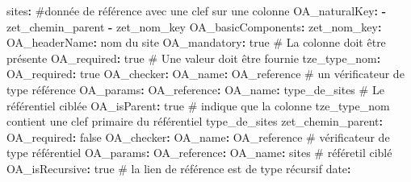 \documentclass[
  letterpaper,
  DIV=11,
  numbers=noendperiod]{scrartcl}
\newenvironment{Shaded}{\begin{snugshade}}{\end{snugshade}}
\newcommand{\AttributeTok}[1]{\textcolor[rgb]{0.40,0.45,0.13}{#1}}
\newcommand{\CharTok}[1]{\textcolor[rgb]{0.13,0.47,0.30}{#1}}
\newcommand{\CommentTok}[1]{\textcolor[rgb]{0.37,0.37,0.37}{#1}}
\newcommand{\FunctionTok}[1]{\textcolor[rgb]{0.28,0.35,0.67}{#1}}
\newcommand{\KeywordTok}[1]{\textcolor[rgb]{0.00,0.23,0.31}{\textbf{#1}}}
\begin{document}
\begin{Shaded}
\begin{Highlighting}[]
\AttributeTok{  }\FunctionTok{sites}\KeywordTok{:}
\CommentTok{  \#donnée de référence avec une clef sur une colonne}
\AttributeTok{    }\FunctionTok{OA\_naturalKey}\KeywordTok{:}\AttributeTok{ }
\AttributeTok{      }\KeywordTok{{-}}\AttributeTok{ zet\_chemin\_parent}
\AttributeTok{      }\KeywordTok{{-}}\AttributeTok{ zet\_nom\_key}
\AttributeTok{    }\FunctionTok{OA\_basicComponents}\KeywordTok{:}
\AttributeTok{      }\FunctionTok{zet\_nom\_key}\KeywordTok{:}
\AttributeTok{        }\FunctionTok{OA\_headerName}\KeywordTok{:}\AttributeTok{ nom du site}
\AttributeTok{        }\FunctionTok{OA\_mandatory}\KeywordTok{:}\AttributeTok{ }\CharTok{true}\CommentTok{ \# La colonne doit être présente}
\AttributeTok{        }\FunctionTok{OA\_required}\KeywordTok{:}\AttributeTok{ }\CharTok{true}\CommentTok{ \# Une valeur doit être fournie}
\AttributeTok{      }\FunctionTok{tze\_type\_nom}\KeywordTok{:}
\AttributeTok{        }\FunctionTok{OA\_required}\KeywordTok{:}\AttributeTok{ }\CharTok{true}
\AttributeTok{        }\FunctionTok{OA\_checker}\KeywordTok{:}
\AttributeTok{          }\FunctionTok{OA\_name}\KeywordTok{:}\AttributeTok{ OA\_reference}\CommentTok{ \# un vérificateur de type référence}
\AttributeTok{          }\FunctionTok{OA\_params}\KeywordTok{:}
\AttributeTok{            }\FunctionTok{OA\_reference}\KeywordTok{:}
\AttributeTok{              }\FunctionTok{OA\_name}\KeywordTok{:}\AttributeTok{ type\_de\_sites}\CommentTok{ \# Le référentiel ciblée}
\AttributeTok{              }\FunctionTok{OA\_isParent}\KeywordTok{:}\AttributeTok{ }\CharTok{true}\CommentTok{ \# indique que la colonne tze\_type\_nom contient une clef primaire du référentiel type\_de\_sites}
\AttributeTok{      }\FunctionTok{zet\_chemin\_parent}\KeywordTok{:}
\AttributeTok{        }\FunctionTok{OA\_required}\KeywordTok{:}\AttributeTok{ }\CharTok{false}
\AttributeTok{        }\FunctionTok{OA\_checker}\KeywordTok{:}
\AttributeTok{          }\FunctionTok{OA\_name}\KeywordTok{:}\AttributeTok{ OA\_reference}\CommentTok{ \# vérificateur de type référentiel}
\AttributeTok{          }\FunctionTok{OA\_params}\KeywordTok{:}
\AttributeTok{            }\FunctionTok{OA\_reference}\KeywordTok{:}
\AttributeTok{              }\FunctionTok{OA\_name}\KeywordTok{:}\AttributeTok{ sites}\CommentTok{ \# référetil ciblé}
\AttributeTok{              }\FunctionTok{OA\_isRecursive}\KeywordTok{:}\AttributeTok{ }\CharTok{true}\CommentTok{ \# la lien de référence est de type récursif}
\AttributeTok{      }\FunctionTok{date}\KeywordTok{:}

\end{Highlighting}
\end{Shaded}
\end{document}
